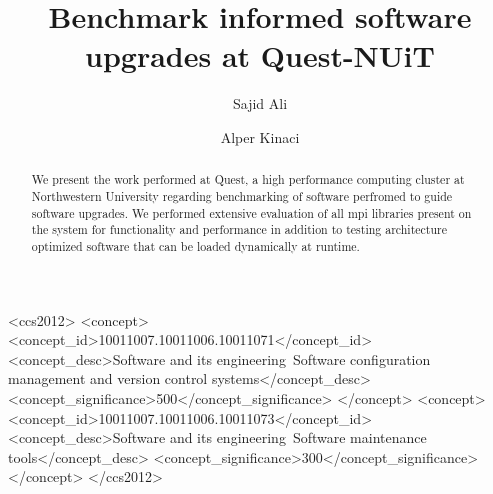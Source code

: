 \documentclass[sigconf,authordraft]{acmart}
\begin{document}
\title{Benchmark informed software upgrades at Quest-NUiT}

\author{Sajid Ali}

\author{Alper Kinaci}


\begin{abstract}
  We present the work performed at Quest, a high performance computing cluster at Northwestern University regarding benchmarking of software perfromed to guide software upgrades. We performed extensive evaluation of all mpi libraries present on the system for functionality and performance in addition to testing architecture optimized software that can be loaded dynamically at runtime.
\end{abstract}

\begin{CCSXML}
	<ccs2012>
	<concept>
	<concept_id>10011007.10011006.10011071</concept_id>
	<concept_desc>Software and its engineering~Software configuration management and version control systems</concept_desc>
	<concept_significance>500</concept_significance>
	</concept>
	<concept>
	<concept_id>10011007.10011006.10011073</concept_id>
	<concept_desc>Software and its engineering~Software maintenance tools</concept_desc>
	<concept_significance>300</concept_significance>
	</concept>
	</ccs2012>
\end{CCSXML}
\end{document}
